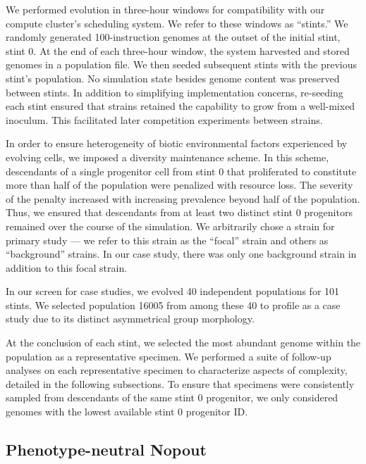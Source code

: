 

We performed evolution in three-hour windows for compatibility with our compute cluster's scheduling system.
We refer to these windows as ``stints.''
We randomly generated 100-instruction genomes at the outset of the initial stint, stint 0.
At the end of each three-hour window, the system harvested and stored genomes in a population file.
We then seeded subsequent stints with the previous stint's population.
No simulation state besides genome content was preserved between stints.
In addition to simplifying implementation concerns, re-seeding each stint ensured that strains retained the capability to grow from a well-mixed inoculum.
This facilitated later competition experiments between strains.

In order to ensure heterogeneity of biotic environmental factors experienced by evolving cells, we imposed a diversity maintenance scheme.
In this scheme, descendants of a single progenitor cell from stint 0 that proliferated to constitute more than half of the population were penalized with resource loss.
The severity of the penalty increased with increasing prevalence beyond half of the population.
Thus, we ensured that descendants from at least two distinct stint 0 progenitors remained over the course of the simulation.
We arbitrarily chose a strain for primary study --- we refer to this strain as the ``focal'' strain and others as ``background'' strains.
In our case study, there was only one background strain in addition to this focal strain.

In our screen for case studies, we evolved 40 independent populations for 101 stints.
We selected population 16005 from among these 40 to profile as a case study due to its distinct asymmetrical group morphology.

At the conclusion of each stint, we selected the most abundant genome within the population as a representative specimen.
We performed a suite of follow-up analyses on each representative specimen to characterize aspects of complexity, detailed in the following subsections.
To ensure that specimens were consistently sampled from descendants of the same stint 0 progenitor, we only considered genomes with the lowest available stint 0 progenitor ID.

\subsection{Phenotype-neutral Nopout}
\label{sec:phenotype_neutral_nopout}

